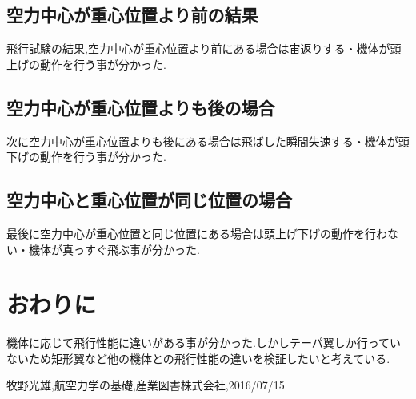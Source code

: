 \documentclass[twocolumn,11pt]{abst}
\begin{document}
\subsection{空力中心が重心位置より前の結果}
飛行試験の結果,空力中心が重心位置より前にある場合は宙返りする・機体が頭上げの動作を行う事が分かった.

\subsection{空力中心が重心位置よりも後の場合}
次に空力中心が重心位置よりも後にある場合は飛ばした瞬間失速する・機体が頭下げの動作を行う事が分かった.

\subsection{空力中心と重心位置が同じ位置の場合}
最後に空力中心が重心位置と同じ位置にある場合は頭上げ下げの動作を行わない・機体が真っすぐ飛ぶ事が分かった.


\section{おわりに}
機体に応じて飛行性能に違いがある事が分かった.しかしテーパ翼しか行っていないため矩形翼など他の機体との飛行性能の違いを検証したいと考えている.

\begin{thebibliography}{8}
 牧野光雄,航空力学の基礎,産業図書株式会社,2016\slash{}07\slash{}15
\end{thebibliography}
\end{document}
